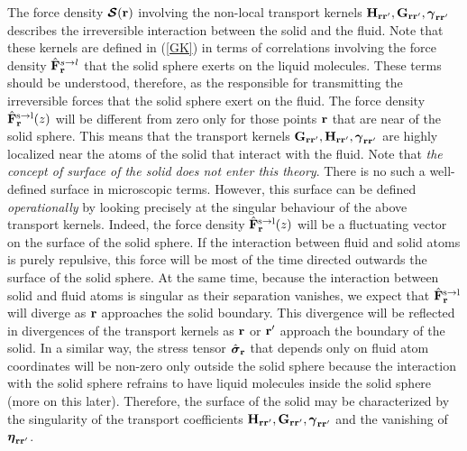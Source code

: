 \documentclass[b5paper,openright,11pt]{book}
\begin{document}
The  force  density  $\boldsymbol{{\cal S}}({\bf  r})$  involving  the
non-local transport  kernels ${\bf H}_{{\bf r}{\bf  r}'},{\bf G}_{{\bf
    r}{\bf r}'}, \boldsymbol{\gamma}_{{\bf  r}{\bf r}'}$ describes the
irreversible interaction between  the solid and the  fluid.  Note that
these  kernels are  defined  in (\ref{GK})  in  terms of  correlations
involving the  force density $\hat{\bf  F}^{s\to l}_{\bf r}$  that the
solid sphere  exerts on the  liquid molecules.  These terms  should be
understood,  therefore,  as  the   responsible  for  transmitting  the
irreversible  forces that  the solid  sphere exert  on the  fluid. The
force density $\hat{\bf F}^{\rm s\to  l}_{\bf r}(z)$ will be different
from zero only for  those points ${\bf r}$ that are  near of the solid
sphere.  This means  that the transport kernels  ${\bf G}_{{\bf r}{\bf
    r}'},{\bf  H}_{{\bf  r}{\bf r}'},\boldsymbol{\gamma}_{{\bf  r}{\bf
    r}'}$  are highly  localized  near  the atoms  of  the solid  that
interact with the  fluid.  Note that  \textit{the concept of
  surface of the solid does not  enter this theory}.  There is no such
a well-defined  surface in  microscopic terms.  However,  this surface
can  be defined  \textit{operationally}  by looking  precisely at  the
singular behaviour of the above  transport kernels.  Indeed, the force
density $\hat{\bf  F}^{\rm s\to l}_{\bf  r}(z)$ will be  a fluctuating
vector on the surface of the solid sphere.  If the interaction between
fluid and solid atoms is purely  repulsive, this force will be most of
the time  directed outwards the surface  of the solid sphere.   At the
same time,  because the interaction  between solid and fluid  atoms is
singular  as  their  separation  vanishes, we  expect  that  $\hat{\bf
  F}_{\bf r}^{\rm  s\to l}$ will  diverge as ${\bf r}$  approaches the
solid boundary.  This  divergence will be reflected  in divergences of
the  transport kernels  as  ${\bf  r}$ or  ${\bf  r}  '$ approach  the
boundary  of  the  solid.   In   a  similar  way,  the  stress  tensor
$\hat{\boldsymbol{\sigma}}_{\bf r}$  that depends  only on  fluid atom
coordinates will be non-zero only outside the solid sphere because the
interaction with  the solid sphere  refrains to have  liquid molecules
inside the solid sphere (more  on this later).  Therefore, the surface
of the solid may be characterized  by the singularity of the transport
coefficients   ${\bf  H}_{{\bf   r}{\bf   r}'},{\bf  G}_{{\bf   r}{\bf
    r}'},\boldsymbol{\gamma}_{{\bf r}{\bf  r}'}$ and the  vanishing of
$\boldsymbol{\eta}_{{\bf r}{\bf r}'}$.
\end{document}
